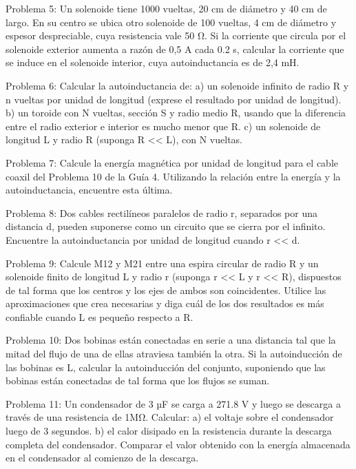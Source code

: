 Problema 5:
Un solenoide tiene 1000 vueltas, 20 cm de diámetro y 40 cm de largo. En su centro se ubica otro solenoide de 100 vueltas, 4 cm de diámetro y espesor despreciable, cuya resistencia vale 50 Ω. Si la corriente que circula por el solenoide exterior aumenta a razón de 0,5 A cada 0.2 s, calcular la corriente que se induce en el solenoide interior, cuya autoinductancia es de 2,4 mH.

Problema 6:
Calcular la autoinductancia de:
a)	un solenoide infinito de radio R y n vueltas por unidad de longitud (exprese el resultado por unidad de longitud).
b)	un toroide con N vueltas, sección S y radio medio R, usando que la diferencia entre el radio exterior e interior es mucho menor que R.
c)	un solenoide de longitud L y radio R (suponga R << L), con N vueltas.
 



Problema 7:
Calcule la energía magnética por unidad de longitud para el cable coaxil del Problema 10 de la Guía 4. Utilizando la relación entre la energía y la autoinductancia, encuentre esta última.

Problema 8:
Dos cables rectilíneos paralelos de radio r, separados por una distancia d, pueden suponerse como un circuito que se cierra por el infinito. Encuentre la autoinductancia por unidad de longitud cuando r << d.



Problema 9:
Calcule M12 y M21 entre una espira circular de radio R y un solenoide finito de longitud L y radio r (suponga r << L y r << R), dispuestos de tal forma que los centros y los ejes de ambos son coincidentes. Utilice las aproximaciones que crea necesarias y diga cuál de los dos resultados es más confiable cuando L es pequeño respecto a R.

Problema 10:
Dos bobinas están conectadas en serie a una distancia tal que la mitad del flujo de una de ellas atraviesa también la otra. Si la autoinducción de las bobinas es L, calcular la autoinducción del conjunto, suponiendo que las bobinas están conectadas de tal forma que los flujos se suman.



Problema 11:
Un condensador de 3 µF se carga a 271.8 V y luego se descarga a través de una resistencia de 1MΩ. Calcular:
a)	el voltaje sobre el condensador luego de 3 segundos.
b)	el calor disipado en la resistencia durante la descarga completa del condensador. Comparar el valor obtenido con la energía almacenada en el condensador al comienzo de la descarga.




